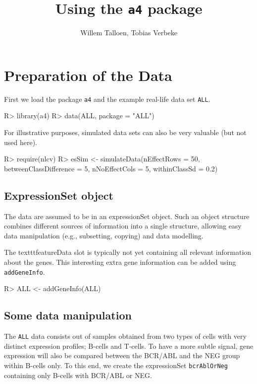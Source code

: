 \documentclass[a4paper]{article}
\begin{document}

\title{Using the \texttt{a4} package}
\author{Willem Talloen, Tobias Verbeke}

\maketitle

\tableofcontents
\pagebreak{}



\section{Preparation of the Data}
First we load the package \texttt{a4} and the example real-life data set \texttt{ALL}.
\begin{Schunk}
\begin{Sinput}
R> library(a4)
R> data(ALL, package = "ALL")
\end{Sinput}
\end{Schunk}

For illustrative purposes, simulated data sets can also be very valuable (but not used here).
\begin{Schunk}
\begin{Sinput}
R> require(nlcv)
R> esSim <- simulateData(nEffectRows = 50, betweenClassDifference = 5, 
     nNoEffectCols = 5, withinClassSd = 0.2)
\end{Sinput}
\end{Schunk}

\subsection{ExpressionSet object}
The data are assumed to be in an expressionSet object. Such an object structure combines different sources
of information into a single structure, allowing easy data manipulation (e.g., subsetting, copying)
and data modelling.

The texttt{featureData} slot is typically not yet containing all relevant
 information about the genes.
This interesting extra gene information can be added using \texttt{addGeneInfo}.

\begin{Schunk}
\begin{Sinput}
R> ALL <- addGeneInfo(ALL)
\end{Sinput}
\end{Schunk}


\subsection{Some data manipulation}
The \texttt{ALL} data consists out of samples obtained from
two types of cells with very distinct expression profiles; B-cells and T-cells. To have a more subtle signal,
gene expression will also be compared between the BCR/ABL and the NEG group within B-cells only.
To this end, we create the expressionSet \texttt{bcrAblOrNeg} containing only B-cells with BCR/ABL or NEG.
  
\end{document}
